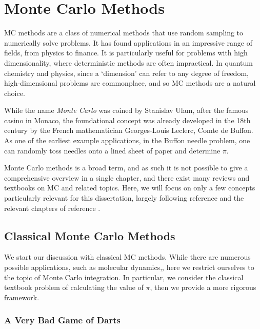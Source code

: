 \chapter{Monte Carlo Methods}
\label{chap:qmc}


\gls{MC} methods are a class of numerical methods that use random sampling to numerically solve problems. It has found applications in an impressive range of fields, from physics to finance. It is particularly useful for problems with high dimensionality, where deterministic methods are often impractical. In quantum chemistry and physics, since a `dimension' can refer to any degree of freedom, high-dimensional problems are commonplace, and so \gls{MC} methods are a natural choice.

While the name \emph{Monte Carlo} was coined by Stanislav Ulam, after the famous casino in Monaco, the foundational concept was already developed in the 18th century by the French mathematician Georges-Louis Leclerc, Comte de Buffon. As one of the earliest example applications, in the Buffon needle problem, one can randomly toss needles onto a lined sheet of paper and determine $\pi$.

Monte Carlo methods is a broad term, and as such it is not possible to give a comprehensive overview in a single chapter, and there exist many reviews and textbooks on \gls{MC} and related topics. Here, we will focus on only a few concepts particularly relevant for this dissertation, largely following reference  and the relevant chapters of reference .

\section{Classical Monte Carlo Methods}

We start our discussion with classical \gls{MC} methods. While there are numerous possible applications, such as molecular dynamics,, here we restrict ourselves to the topic of Monte Carlo integration. In particular, we consider the classical textbook problem of calculating the value of $\pi$, then we provide a more rigorous framework.

\subsection{A Very Bad Game of Darts}

